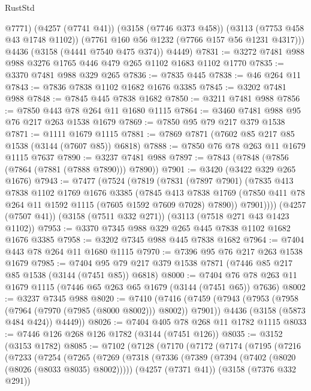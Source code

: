 \begin{lexlean}{RustStd}
\begin{coremodule}
{\begin{coremodule}
{{{{{{{{{{{{{{{{{{{{{{{{{{          @7771)
        (@4257 (@7741 @41))
        (@3158 (@7746 @373 @458))
        (@3113 (@7753 @458 @43 @1748 @1102))
        (@7761 @160 @56 @1232 (@7766 @157 @56 @1231 @4317)))
      @4436
      (@3158 (@4441 @7540 @475 @374))
      @4449)
@7831 := @3272 @7481 @988 @988 @3276 @1765 @446 @479 @265 @1102 @1683 @1102 @1770
@7835 := @3370 @7481 @988 @329 @265
@7836 := @7835 @445
@7838 := @46 @264 @11
@7843 := @7836 @7838 @1102 @1682 @1676 @3385
@7845 := @3202 @7481 @988
@7848 := @7845 @445 @7838 @1682
@7850 := @3211 @7481 @988
@7856 := @7850 @443 @78 @264 @11 @1680 @1115
@7864 := @3460 @7481 @988 @95 @76 @217 @263 @1538 @1679
@7869 := @7850 @95 @79 @217 @379 @1538
@7871 := @1111 @1679 @1115
@7881 := @7869 @7871 (@7602 @85 @217 @85 @1538 (@3144 (@7607 @85)) @6818)
@7888 := @7850 @76 @78 @263 @11 @1679 @1115 @7637
@7890 := @3237 @7481 @988
@7897 := @7843 (@7848 (@7856 (@7864 (@7881 (@7888 @7890))) @7890))
@7901 := @3420 (@3422 @329 @265 @1676)
@7943 := @7477
    (@7524
      (@7819
        (@7831
          (@7897 @7901)
          (@7835
            @413
            @7838
            @1102
            @1769
            @1676
            @3385
            (@7845
              @413
              @7838
              @1769
              (@7850 @411 @78 @264 @11 @1592 @1115 (@7605 @1592 @7609 @7028) @7890))
            @7901))))
    (@4257 (@7507 @41))
    (@3158 (@7511 @332 @271))
    (@3113 (@7518 @271 @43 @1423 @1102))
@7953 := @3370 @7345 @988 @329 @265 @445 @7838 @1102 @1682 @1676 @3385
@7958 := @3202 @7345 @988 @445 @7838 @1682
@7964 := @7404 @443 @78 @264 @11 @1680 @1115
@7970 := @7396 @95 @76 @217 @263 @1538 @1679
@7985 := @7404 @95 @79 @217 @379 @1538 @7871 (@7446 @85 @217 @85 @1538 (@3144 (@7451 @85)) @6818)
@8000 := @7404 @76 @78 @263 @11 @1679 @1115 (@7446 @65 @263 @65 @1679 (@3144 (@7451 @65)) @7636)
@8002 := @3237 @7345 @988
@8020 := @7410
    (@7416
      (@7459
        (@7943 (@7953 (@7958 (@7964 (@7970 (@7985 (@8000 @8002))) @8002)) @7901))
        @4436
        (@3158 (@5873 @484 @424))
        @4449))
@8026 := @7404 @405 @78 @268 @11 @1782 @1115
@8033 := @7446 @126 @268 @126 @1782 (@3144 (@7451 @126))
@8035 := @3152 (@3153 @1782)
@8085 := @7102
    (@7128
      (@7170
        (@7172
          (@7174
            (@7195
              (@7216
                (@7233
                  (@7254
                    (@7265
                      (@7269
                        (@7318
                          (@7336
                            (@7389 (@7394 (@7402 (@8020 (@8026 (@8033 @8035) @8002)))))
                            (@4257 (@7371 @41))
                            (@3158 (@7376 @332 @291))
}}}}}}}}}}}}}}}}}}}}}}}}}}
\end{coremodule}}
\end{coremodule}
\end{lexlean}
